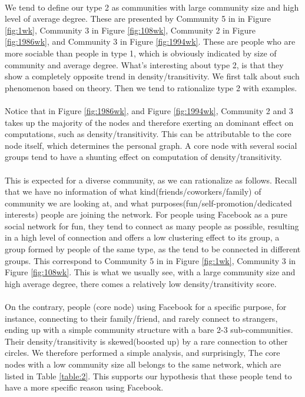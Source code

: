 \paragraph{}
We tend to define our type 2 as communities with large community size and high level of average degree. These are presented by Community 5 in in Figure \ref{fig:1wk}, Community 3 in Figure \ref{fig:108wk}, Community 2 in Figure \ref{fig:1986wk}, and Community 3 in Figure \ref{fig:1994wk}. These are people who are more sociable than people in type 1, which is obviously indicated by size of community and average degree. What's interesting about type 2, is that they show a completely opposite trend in density/transitivity. We first talk about such phenomenon based on theory. Then we tend to rationalize type 2 with examples.
\paragraph{}
Notice that in Figure \ref{fig:1986wk}, and Figure \ref{fig:1994wk}, Community 2 and 3 takes up the majority of the nodes and therefore exerting an dominant effect on computations, such as density/transitivity. This can be attributable to the core node itself, which determines the personal graph. A core node with several social groups tend to have a shunting effect on computation of density/transitivity.
\paragraph{}
This is expected for a diverse community, as we can rationalize as follows. Recall that we have no information of what kind(friends/coworkers/family) of community we are looking at, and what purposes(fun/self-promotion/dedicated interests) people are joining the network. For people using Facebook as a pure social network for fun, they tend to connect as many people as possible, resulting in a high level of connection and offers a low clustering effect to its group, a group formed by people of the same type, as the tend to be connected in different groups. This correspond to Community 5 in in Figure \ref{fig:1wk}, Community 3 in Figure \ref{fig:108wk}. This is what we usually see, with a large community size and high average degree, there comes a relatively low density/transitivity score.
\paragraph{}
On the contrary, people (core node) using Facebook for a specific purpose, for instance, connecting to their family/friend, and rarely connect to strangers, ending up with a simple community structure with a bare 2-3 sub-communities. Their density/transitivity is skewed(boosted up) by a rare connection to other circles. We therefore performed a simple analysis, and surprisingly, The core nodes with a low community size all belongs to the same network, which are listed in Table \ref{table:2}. This supports our hypothesis that these people tend to have a more specific reason using Facebook.

